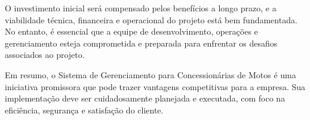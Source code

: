        O investimento inicial será compensado pelos benefícios a longo prazo, e a viabilidade técnica, financeira e operacional do projeto está bem fundamentada. No entanto, é essencial que a equipe de desenvolvimento, operações e gerenciamento esteja comprometida e preparada para enfrentar os desafios associados ao projeto.
       
       Em resumo, o Sistema de Gerenciamento para Concessionárias de Motos é uma iniciativa promissora que pode trazer vantagens competitivas para a empresa. Sua implementação deve ser cuidadosamente planejada e executada, com foco na eficiência, segurança e satisfação do cliente.
